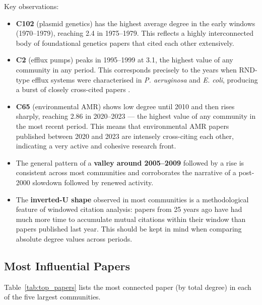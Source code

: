 \documentclass[12pt,a4paper]{article}
\begin{document}
Key observations:

\begin{itemize}
    \item \textbf{C102} (plasmid genetics) has the highest average degree in the early
    windows (1970--1979), reaching 2.4 in 1975--1979.
    This reflects a highly interconnected body of foundational genetics papers that
    cited each other extensively.

    \item \textbf{C2} (efflux pumps) peaks in 1995--1999 at 3.1, the highest value
    of any community in any period.
    This corresponds precisely to the years when RND-type efflux systems were
    characterised in \textit{P. aeruginosa} and \textit{E. coli}, producing a burst of
    closely cross-cited papers \cite{nikaido2009}.

    \item \textbf{C65} (environmental AMR) shows low degree until 2010 and then rises
    sharply, reaching 2.86 in 2020--2023 --- the highest value of any community in the
    most recent period.
    This means that environmental AMR papers published between 2020 and 2023 are
    intensely cross-citing each other, indicating a very active and cohesive research
    front.

    \item The general pattern of a \textbf{valley around 2005--2009} followed by a
    rise is consistent across most communities and corroborates the narrative of a
    post-2000 slowdown followed by renewed activity.

    \item The \textbf{inverted-U shape} observed in most communities is a methodological
    feature of windowed citation analysis: papers from 25 years ago have had much more
    time to accumulate mutual citations within their window than papers published last
    year.
    This should be kept in mind when comparing absolute degree values across periods.
\end{itemize}

\subsection{Most Influential Papers}

Table~\ref{tab:top_papers} lists the most connected paper (by total degree) in each of
the five largest communities.
\end{document}
